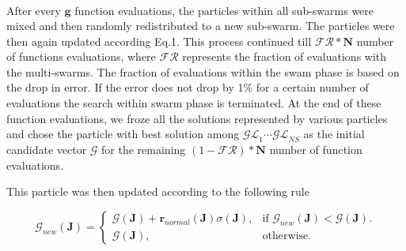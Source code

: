 \documentclass[12pt]{article}
\begin{document}
\begin{eqnarray}
\end{eqnarray}

\begin{algorithm}
\end{algorithm}

After every $\mathbf{g}$  function evaluations, the particles within all sub-swarms were mixed and then randomly redistributed to a new sub-swarm. The particles were then again updated according Eq.1. This process continued till $\mathcal{FR}*\mathbf{N}$ number of functions evaluations, where $\mathcal{FR}$ represents the fraction of evaluations with the multi-swarms. The fraction of evaluations within the swam phase is based on the drop in error. If the error does not drop by 1\% for a certain number of evaluations the search within swarm phase is terminated. At the end of these function evaluations, we froze all the solutions represented by various particles and chose the particle with best solution among $\mathcal{GL}_{1} \cdots \mathcal{GL}_{NS}$ as the initial candidate vector $\mathcal{G}$ for the remaining $({1}-\mathcal{FR})*\mathbf{N}$ number of function evaluations.

This particle was then updated according to the following rule

\begin{equation}
  \mathcal{G}_{new}(\mathbf{J})=\begin{cases}
    \mathcal{G}(\mathbf{J})+\mathbf{r}_{normal}(\mathbf{J})\sigma(\mathbf{J}), & \text{if $\mathcal{G}_{new}(\mathbf{J})<\mathcal{G}(\mathbf{J})$}.\\
    \mathcal{G}(\mathbf{J}), & \text{otherwise}.
  \end{cases}
\end{equation}
\end{document}
